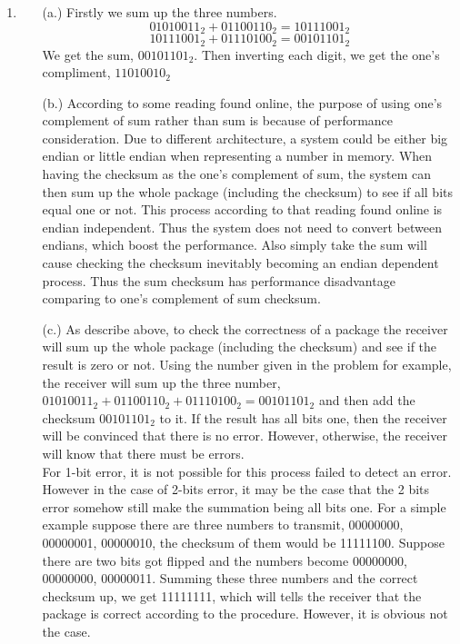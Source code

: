 \documentclass[12pt]{article}
\begin{document}
\begin{singlespace}
\begin{enumerate}
\item 
	\begin{itemize}
	\item[(a.)] Firstly we sum up the three numbers.
	\begin{equation*}
	01010011_2 + 01100110_2 = 10111001_2
	\end{equation*}
	\begin{equation*}
	10111001_2 + 01110100_2 = 00101101_2
	\end{equation*}
	We get the sum, $00101101_2$.
	Then inverting each digit, we get the one's compliment, $11010010_2$
	\item[(b.)] According to some reading found online, the purpose of using one's complement of sum rather than sum is because of performance consideration. Due to different architecture, a system could be either big endian or little endian when representing a number in memory. When having the checksum as the one's complement of sum, the system can then sum up the whole package (including the checksum) to see if all bits equal one or not. This process according to that reading found online is endian independent. Thus the system does not need to convert between endians, which boost the performance. Also simply take the sum will cause checking the checksum inevitably becoming an endian dependent process. Thus the sum checksum has performance disadvantage comparing to one's complement of sum checksum.
	\item[(c.)] As describe above, to check the correctness of a package the receiver will sum up the whole package (including the checksum) and see if the result is zero or not. Using the number given in the problem for example, the receiver will sum up the three number, $01010011_2 + 01100110_2 + 01110100_2 = 00101101_2$ and then add the checksum $00101101_2$ to it. If the result has all bits one, then the receiver will be convinced that there is no error. However, otherwise, the receiver will know that there must be errors.\\
	For 1-bit error, it is not possible for this process failed to detect an error. However in the case of 2-bits error, it may be the case that the 2 bits error somehow still make the summation being all bits one. For a simple example suppose there are three numbers to transmit, 00000000, 00000001, 00000010, the checksum of them would be 11111100. Suppose there are two bits got flipped and the numbers become 00000000, 00000000, 00000011. Summing these three numbers and the correct checksum up, we get 11111111, which will tells the receiver that the package is correct according to the procedure. However, it is obvious not the case.

\end{itemize}
\end{enumerate}
\end{singlespace}
\end{document}
